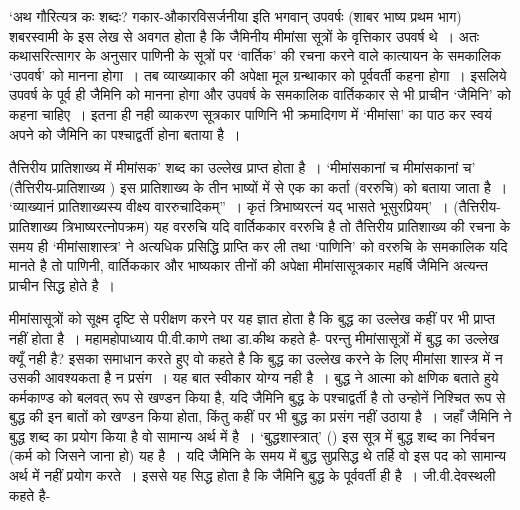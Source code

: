‘अथ गौरित्यत्र कः शब्दः? गकार-औकारविसर्जनीया इति भगवान् उपवर्षः (शाबर भाष्य प्रथम भाग) शबरस्वामी के इस लेख से अवगत होता है कि जैमिनीय मीमांसा सूत्रों के वृत्तिकार उपवर्ष थे~। अतः कथासरित्सागर के अनुसार पाणिनी के सूत्रों पर ‘वार्तिक' की रचना करने वाले कात्यायन के समकालिक ‘उपवर्ष' को मानना होगा~। तब व्याख्याकार की अपेक्षा मूल ग्रन्थाकार को पूर्ववर्ती कहना होगा~। इसलिये उपवर्ष के पूर्व ही जैमिनि को मानना होगा और उपवर्ष के समकालिक वार्तिककार से भी प्राचीन ‘जैमिनि' को कहना चाहिए~। इतना ही नही व्याकरण सूत्रकार पाणिनि भी क्रमादिगण में ‘मीमांसा' का पाठ कर स्वयं अपने को जैमिनि का पश्चाद्वर्ती होना बताया है~।

तैत्तिरीय प्रातिशाख्य में मीमांसक' शब्द का उल्लेख प्राप्त होता है~। ‘मीमांसकानां च मीमांसकानां च' (तैत्तिरीय-प्रातिशाख्य ) इस प्रातिशाख्य के तीन भाष्यों में से एक का कर्ता (वररुचि) को बताया जाता है~। ‘व्याख्यानं प्रातिशाख्यस्य वीक्ष्य वाररुचादिकम्”~। कृतं त्रिभाष्यरत्नं यद् भासते भूसुरप्रियम्'~। (तैत्तिरीय-प्रातिशाख्य त्रिभाष्यरत्नोपक्रम) यह वररुचि यदि वार्तिककार वररुचि है तो तैत्तिरीय प्रातिशाख्य की रचना के समय ही ‘मीमांसाशास्त्र' ने अत्यधिक प्रसिद्धि प्राप्ति कर ली तथा ‘पाणिनि' को वररुचि के समकालिक यदि मानते है तो पाणिनी, वार्तिककार और भाष्यकार तीनों की अपेक्षा मीमांसासूत्रकार महर्षि जैमिनि अत्यन्त प्राचीन सिद्ध होते है~।

मीमांसासूत्रों को सूक्ष्म दृष्टि से परीक्षण करने पर यह ज्ञात होता है कि बुद्ध का उल्लेख कहीं पर भी प्राप्त नहीं होता है~। महामहोपाध्याय पी.वी.काणे  तथा डा.कीथ कहते है-  परन्तु मीमांसासूत्रों में बुद्ध का उल्लेख क्यूँ नही है? इसका समाधान करते हुए वो कहते है कि बुद्ध का उल्लेख करने के लिए मीमांसा शास्त्र में न उसकी आवश्यकता है न प्रसंग~। यह बात स्वीकार योग्य नही है~। बुद्ध ने आत्मा को क्षणिक बताते हुये कर्मकाण्ड को बलवत् रूप से खण्डन किया है, यदि जैमिनि बुद्ध के पश्चाद्वर्ती है तो उन्होनें निश्चित रूप से बुद्ध की इन बातों को खण्डन किया होता, किंतु कहीं पर भी बुद्ध का प्रसंग नहीं उठाया है~। जहाँ जैमिनि ने बुद्ध शब्द का प्रयोग किया है वो सामान्य अर्थ में है~। ‘बुद्धशास्त्रात्' () इस सूत्र में बुद्ध शब्द का निर्वचन (कर्म को जिसने जाना हो) यह है~। यदि जैमिनि के समय में बुद्ध सुप्रसिद्ध थे तर्हि वो इस पद को सामान्य अर्थ में नहीं प्रयोग करते~। इससे यह सिद्ध होता है कि जैमिनि बुद्ध के पूर्ववर्ती ही है~। जी.वी.देवस्थली कहते है- 

